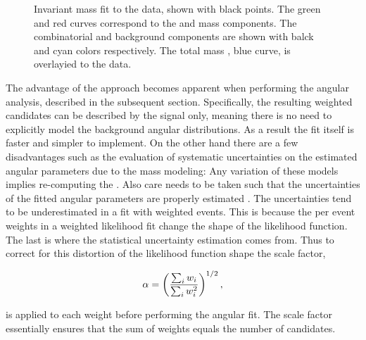 \begin{figure}[t]
  \centering
  \scalebox{0.5}{}
  \caption{Invariant mass fit to the data, shown with black points. The green and red curves correspond to the \BdJpsiKst and
           \BsJpsiKst mass \pdf components. The combinatorial and \LbJpsipK background components are shown with balck and cyan
           colors respectively. The total mass \pdf, blue curve, is overlayied to the data. }
  \label{mass_plot}
\end{figure}

The advantage of the \sWeights approach becomes apparent when performing the angular analysis, described in the subsequent section.
Specifically, the resulting weighted candidates can be described by the signal \pdf only, meaning there is no need to explicitly model
the background angular distributions. As a result the fit itself is faster and simpler to implement. On the other hand there are a few
disadvantages such as the evaluation of systematic uncertainties on the estimated angular parameters due to the mass \pdf modeling:
Any variation of these models implies re-computing the \sWeights. Also care needs to be taken such that the uncertainties
of the fitted angular parameters are properly estimated \cite{splot}. The uncertainties tend to be underestimated in a fit with weighted
events. This is because the per event weights in a weighted likelihood fit change the shape of the likelihood function.
The last is where the statistical uncertainty estimation comes from. Thus to correct for this distortion of the likelihood
function shape the scale factor,

\begin{equation}
  \centering
  \alpha = \left(\frac{\sum_{i} w_i}{\sum_{i} w_i^2}\right)^{1/2},
  \label{sWeights_scale_factor}
\end{equation}

\noindent is applied to each weight before performing the angular fit. The scale factor essentially ensures that the sum of weights
equals the number of candidates.
